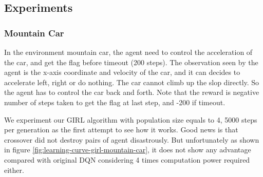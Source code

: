 \documentclass[a4paper]{article}
\begin{document}
\subsection{Experiments}
\label{sec:GIRL-exp}

\subsubsection*{Mountain Car}

In the environment mountain car, the agent need to control the acceleration of the car, and get the flag before timeout (200 steps). The observation seen by the agent is the x-axis coordinate and velocity of the car, and it can decides to accelerate left, right or do nothing. The car cannot climb up the slop directly. So the agent has to control the car back and forth. Note that the reward is negative number of steps taken to get the flag at last step, and -200 if timeout.


We experiment our GIRL algorithm with population size equals to 4, 5000 steps per generation as the first attempt to see how it works. Good news is that crossover did not destroy pairs of agent disastrously. But unfortunately as shown in figure \ref{fig:learning-curve-girl-mountain-car}, it does not show any advantage compared with original DQN considering 4 times computation power required either.
\end{document}
